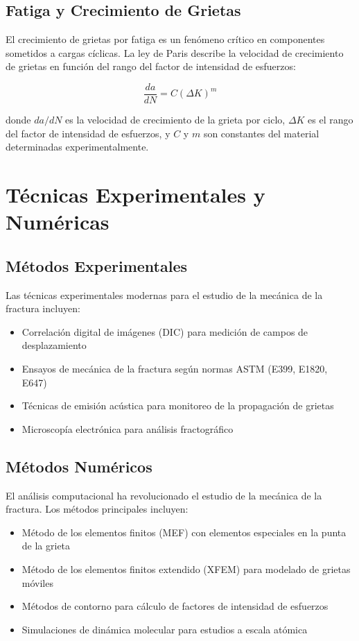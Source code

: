 \documentclass[12pt,letterpaper]{article}
\begin{document}
\subsection{Fatiga y Crecimiento de Grietas}

El crecimiento de grietas por fatiga es un fenómeno crítico en componentes sometidos a cargas cíclicas. La ley de Paris describe la velocidad de crecimiento de grietas en función del rango del factor de intensidad de esfuerzos:

\begin{equation}
\frac{da}{dN} = C(\Delta K)^m
\end{equation}

donde $da/dN$ es la velocidad de crecimiento de la grieta por ciclo, $\Delta K$ es el rango del factor de intensidad de esfuerzos, y $C$ y $m$ son constantes del material determinadas experimentalmente.

\section{Técnicas Experimentales y Numéricas}

\subsection{Métodos Experimentales}

Las técnicas experimentales modernas para el estudio de la mecánica de la fractura incluyen:

\begin{itemize}
\item Correlación digital de imágenes (DIC) para medición de campos de desplazamiento
\item Ensayos de mecánica de la fractura según normas ASTM (E399, E1820, E647)
\item Técnicas de emisión acústica para monitoreo de la propagación de grietas
\item Microscopía electrónica para análisis fractográfico
\end{itemize}

\subsection{Métodos Numéricos}

El análisis computacional ha revolucionado el estudio de la mecánica de la fractura. Los métodos principales incluyen:

\begin{itemize}
\item Método de los elementos finitos (MEF) con elementos especiales en la punta de la grieta
\item Método de los elementos finitos extendido (XFEM) para modelado de grietas móviles
\item Métodos de contorno para cálculo de factores de intensidad de esfuerzos
\item Simulaciones de dinámica molecular para estudios a escala atómica
\end{itemize}
\end{document}
